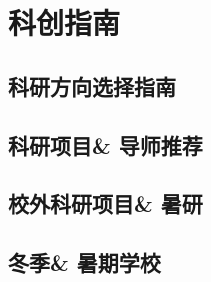 \chapter{科创指南}

\section{科研方向选择指南}

\section{科研项目\& 导师推荐}

\section{校外科研项目\& 暑研}

\section{冬季\& 暑期学校}